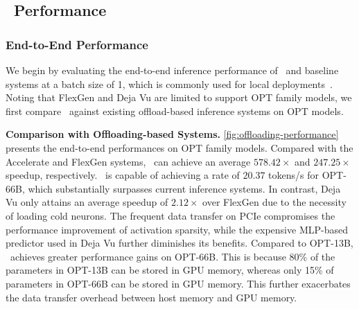 

\subsection{\name~Performance}\label{sec:end-to-end}

\subsubsection{End-to-End Performance}
We begin by evaluating the end-to-end inference performance of \name~and baseline systems at a batch size of 1, which is commonly used for local deployments~\cite{cai2023medusa}. Noting that FlexGen and Deja Vu are limited to support OPT family models, we first compare \name~against existing offload-based inference systems on OPT models. 

\textbf{Comparison with Offloading-based Systems. } \fig \ref{fig:offloading-performance} presents the end-to-end performances on OPT family models. Compared with the Accelerate and FlexGen systems, \name~can achieve an average $578.42 \times$ and $247.25 \times$ speedup, respectively. \name~is capable of achieving a rate of $20.37$ tokens/s for OPT-66B, which substantially surpasses current inference systems. In contrast, Deja Vu only attains an average speedup of $2.12 \times$ over FlexGen due to the necessity of loading cold neurons. The frequent data transfer on PCIe compromises the performance improvement of activation sparsity, while the expensive MLP-based predictor used in Deja Vu further diminishes its benefits. Compared to OPT-13B, \name~achieves greater performance gains on OPT-66B. This is because 80\% of the parameters in OPT-13B can be stored in GPU memory, whereas only 15\% of parameters in OPT-66B can be stored in GPU memory. This further exacerbates the data transfer overhead between host memory and GPU memory. 

